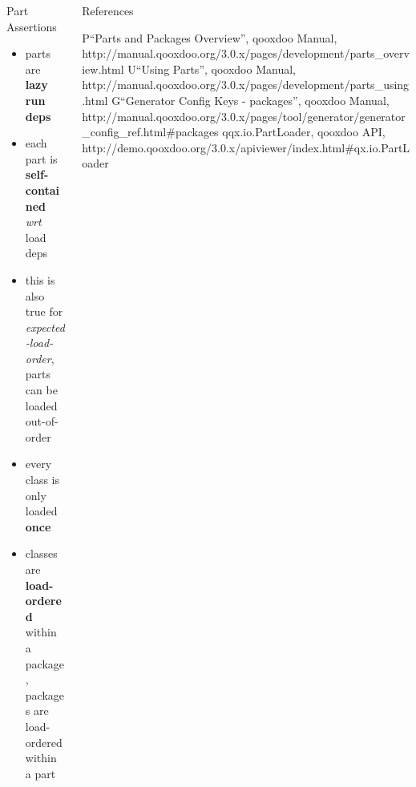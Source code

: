 \documentclass[final]{beamer}
\newlength{\onecolwid}
\newlength{\twocolwid}
\begin{document}
\begin{frame}[t]
\begin{columns}[t]
\begin{column}{\twocolwid}

    \begin{columns}[t,totalwidth=\twocolwid]
    \begin{column}{\onecolwid}
      \begin{block}{Part Assertions}
        \begin{itemize}
          \item parts are \textbf{lazy run deps}
          \item each part is \textbf{self-contained} \textit{wrt} load deps 
          \item this is also true for \textit{expected-load-order}, parts
            can be loaded out-of-order
          \item every class is only loaded \textbf{once}
          \item classes are \textbf{load-ordered} within a package, packages are
            load-ordered within a part
        \end{itemize}
      \end{block}

    \end{column}

    \begin{column}{\onecolwid}
      \begin{block}{References}
        \small{\begin{thebibliography}{99}
          \bibitem P``Parts and Packages Overview'', qooxdoo Manual,
            {\scriptsize http://manual.qooxdoo.org/3.0.x/pages/development/parts\_overview.html}
          \bibitem U``Using Parts'', qooxdoo Manual,
            {\scriptsize http://manual.qooxdoo.org/3.0.x/pages/development/parts\_using.html}
          \bibitem G``Generator Config Keys - packages'', qooxdoo Manual,
            {\scriptsize http://manual.qooxdoo.org/3.0.x/pages/tool/generator/generator\_config\_ref.html\#packages}
          \bibitem qqx.io.PartLoader, qooxdoo API,
            {\scriptsize http://demo.qooxdoo.org/3.0.x/apiviewer/index.html\#qx.io.PartLoader}
        \end{thebibliography}}
      \end{block}

    \end{column}

    \end{columns}
    \end{column}  %



\end{columns}
\end{frame}
\end{document}
